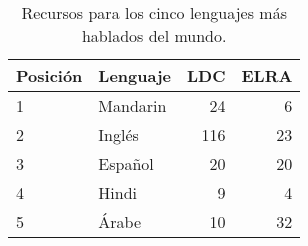 \begin{table}[H]
\centering
\caption{Recursos para los cinco lenguajes más hablados del mundo.}
\label{tab:resources_by_langauge}
\begin{tabular}{|l|l|r|r|} %
\hline
\textbf{Posición} & \textbf{Lenguaje} & \textbf{LDC} & \textbf{ELRA} \\ \hline
1    & Mandarin & 24  & 6    \\ \hline
2    & Inglés  & 116 & 23   \\ \hline
3    & Español  & 20  & 20   \\ \hline
4    & Hindi    & 9   & 4    \\ \hline
5    & Árabe   & 10  & 32   \\ \hline
\end{tabular}
\end{table}